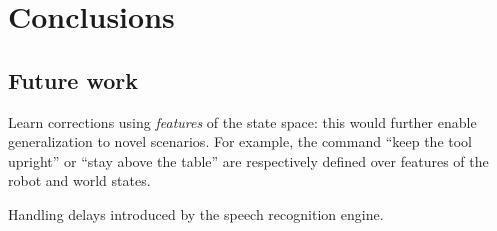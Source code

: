 \section{Conclusions}
\label{secConclusions}




\subsection{Future work}

Learn corrections using \emph{features} of the state space: this would further enable generalization to novel scenarios.
For example, the command ``keep the tool upright'' or ``stay above the table'' are respectively defined over features of the robot and world states.


Handling delays introduced by the speech recognition engine.
